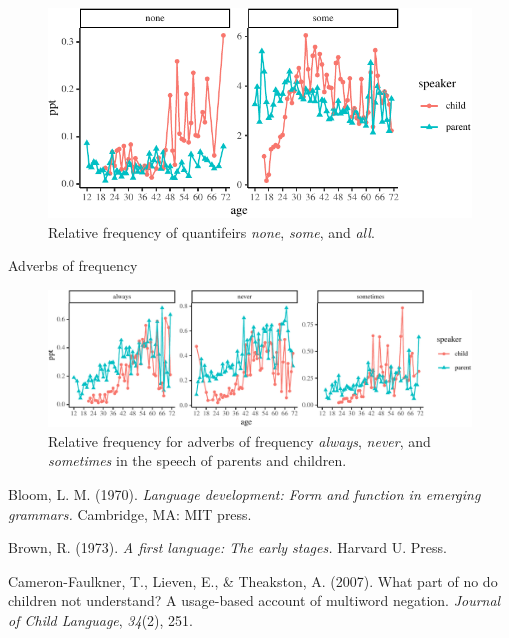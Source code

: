 \documentclass[man,floatsintext,draftall]{apa6}
\begin{document}
\begin{figure}
\centering
\includegraphics{negation_production_files/figure-latex/quantifiers-1.pdf}
\caption{\label{fig:quantifiers}Relative frequency of quantifeirs \emph{none}, \emph{some}, and \emph{all}.}
\end{figure}

Adverbs of frequency

\begin{figure}
\centering
\includegraphics{negation_production_files/figure-latex/adverbs-1.pdf}
\caption{\label{fig:adverbs}Relative frequency for adverbs of frequency \emph{always}, \emph{never}, and \emph{sometimes} in the speech of parents and children.}
\end{figure}

\begingroup
\setlength{\parindent}{-0.5in}
\setlength{\leftskip}{0.5in}

\endgroup

\hypertarget{refs}{}
\leavevmode\hypertarget{ref-bloom1970}{}%
Bloom, L. M. (1970). \emph{Language development: Form and function in emerging grammars.} Cambridge, MA: MIT press.

\leavevmode\hypertarget{ref-brown1973first}{}%
Brown, R. (1973). \emph{A first language: The early stages.} Harvard U. Press.

\leavevmode\hypertarget{ref-cameron2007part}{}%
Cameron-Faulkner, T., Lieven, E., \& Theakston, A. (2007). What part of no do children not understand? A usage-based account of multiword negation. \emph{Journal of Child Language}, \emph{34}(2), 251.
\end{document}

